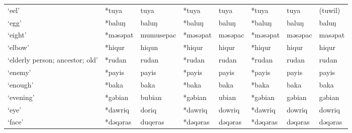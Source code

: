 \begin{landscape}
\begin{longtable}[c]{@{}p{3cm}<{\raggedright}p{2.75cm}<{\raggedright}p{2.75cm}<{\raggedright}p{2.75cm}<{\raggedright}p{2.75cm}<{\raggedright}p{2.75cm}<{\raggedright}p{2.75cm}<{\raggedright}p{2.75cm}<{\raggedright}@{}}
`eel'                                                & *tuya        & tuya                          & *tuya          & tuya                       & *tuya            & tuya                     & (tuwil)                           \\
`egg'                                                & *baluŋ       & baluŋ                         & *baluŋ         & baluŋ                      & *baluŋ           & baluŋ                    & baluŋ                             \\
`eight'                                              & *məsəpat     & mumusepac                     & *məsəpat       & məsəpac                    & *məsəpat         & məsəpac                  & masəpat                           \\
`elbow'                                              & *hiqur       & hiqun                         & *hiqur         & hiqur                      & *hiqur           & hiqur                    & hiqur                             \\
`elderly person; ancestor; old'                      & *rudan       & rudan                         & *rudan         & rudan                      & *rudan           & rudan                    & rudan                             \\
`enemy'                                              & *payis       & payis                         & *payis         & payis                      & *payis           & payis                    & payis                             \\
`enough'                                             & *baka        & baka                          & *baka          & baka                       & *baka            & baka                     & baka                              \\
`evening'                                            & *gəbian      & bubian                        & *gəbian        & ubian                      & *gəbian          & gəbian                   & gəbian                            \\
`eye'                                                & *dawriq      & doriq                         & *dawriq        & dowriq                     & *dawriq          & dowriq                   & dowriq                            \\
`face'                                               & *dəqəras     & duqeras                       & *dəqəras       & dəqəras                    & *dəqəras         & dəqəras                  & dəqəras                           \\

\end{longtable}
\end{landscape}
